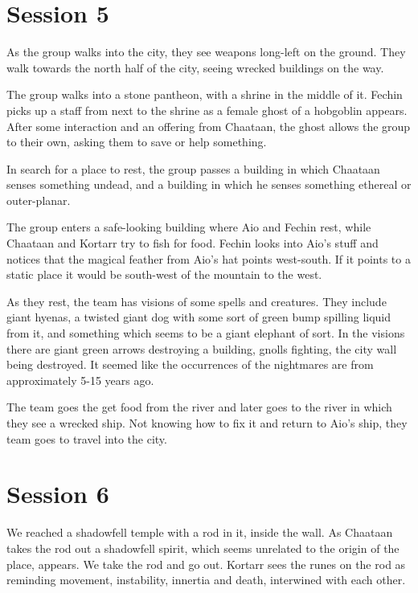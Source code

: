 \documentclass[10pt,a4paper,twoside,openany,hidelinks]{book}
\begin{document}
\chapter*{Session 5}


As the group walks into the city, they see weapons long-left on the ground. They walk towards the north half of the city, seeing wrecked buildings on the way.

The group walks into a stone pantheon, with a shrine in the middle of it. Fechin picks up a staff from next to the shrine as a female ghost of a hobgoblin appears. After some interaction and an offering from Chaataan, the ghost allows the group to their own, asking them to save or help something.

In search for a place to rest, the group passes a building in which Chaataan senses something undead, and a building in which he senses something ethereal or outer-planar.

The group enters a safe-looking building where Aio and Fechin rest, while Chaataan and Kortarr try to fish for food. Fechin looks into Aio's stuff and notices that the magical feather from Aio's hat points west-south. If it points to a static place it would be south-west of the mountain to the west.

As they rest, the team has visions of some spells and creatures. They include giant hyenas, a twisted giant dog with some sort of green bump spilling liquid from it, and something which seems to be a giant elephant of sort.
In the visions there are giant green arrows destroying a building, gnolls fighting, the city wall being destroyed.
It seemed like the occurrences of the nightmares are from approximately 5-15 years ago.

The team goes the get food from the river and later goes to the river in which they see a wrecked ship. Not knowing how to fix it and return to Aio's ship, they team goes to travel into the city.

\chapter*{Session 6}

We reached a shadowfell temple with a rod in it, inside the wall. As Chaataan takes the rod out a shadowfell spirit, which seems unrelated to the origin of the place, appears. We take the rod and go out. Kortarr sees the runes on the rod as reminding movement, instability, innertia and death, interwined with each other.
\end{document}
